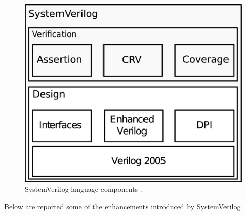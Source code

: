 \begin{figure}[htbp]
\centering
\includegraphics[width=0.5\linewidth]{pictures/SystemVerilog_structure.eps}
\caption{SystemVerilog language components \cite{rich2003evolution}.}
\label{fig:stoa:svcomponents}
\end{figure}

Below are reported some of the enhancements introduced by SystemVerilog


